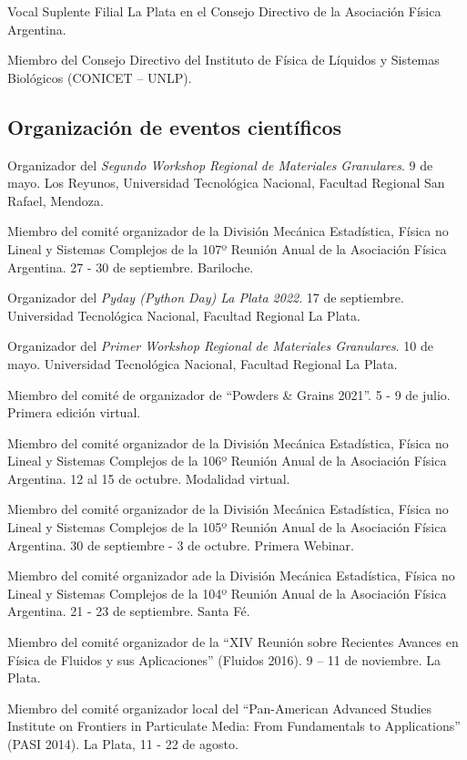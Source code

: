    Vocal Suplente Filial La Plata en el Consejo Directivo de la Asociación Física Argentina.
  
   Miembro del Consejo Directivo del Instituto de Física de Líquidos y Sistemas Biológicos (CONICET -- UNLP).
  


\subsection{Organización de eventos científicos}

 Organizador del \textit{Segundo Workshop Regional de Materiales Granulares}. 9 de mayo. Los Reyunos, Universidad Tecnológica Nacional, Facultad Regional San Rafael, Mendoza.
\pagebreak

 Miembro del comité organizador de la División Mecánica Estadística, Física no Lineal y Sistemas Complejos de la 107º Reunión Anual de la Asociación Física Argentina. 27 - 30 de septiembre. Bariloche.

 Organizador del \textit{Pyday (Python Day) La Plata 2022}. 17 de septiembre. Universidad Tecnológica Nacional, Facultad Regional La Plata.

 Organizador del \textit{Primer Workshop Regional de Materiales Granulares}. 10 de mayo. Universidad Tecnológica Nacional, Facultad Regional La Plata.

 Miembro del comité de organizador de ``Powders \& Grains 2021''. 5 - 9 de julio. Primera edición virtual.

 Miembro del comité organizador de la División Mecánica Estadística, Física no Lineal y Sistemas Complejos de la 106º Reunión Anual de la Asociación Física Argentina. 12 al 15 de octubre. Modalidad virtual.

 Miembro del comité organizador de la División Mecánica Estadística, Física no Lineal y Sistemas Complejos de la 105º Reunión Anual de la Asociación Física Argentina. 30 de septiembre - 3 de octubre. Primera Webinar.

 Miembro del comité organizador ade la División Mecánica Estadística, Física no Lineal y Sistemas Complejos de la 104º Reunión Anual de la Asociación Física Argentina. 21 - 23 de septiembre. Santa Fé.

 Miembro del comité organizador de la ``XIV Reunión sobre Recientes Avances en Física de Fluidos y sus Aplicaciones'' (Fluidos 2016). 9 -- 11 de noviembre. La Plata.

 Miembro del comité organizador local del ``Pan-American Advanced Studies Institute on Frontiers in Particulate Media: From Fundamentals to Applications'' (PASI 2014). La Plata, 11 - 22 de agosto.
